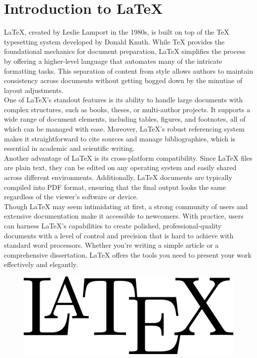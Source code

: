 \documentclass[12pt, a4paper]{article}
\begin{document}
\section*{Introduction to LaTeX}
\vspace{2cm}
LaTeX, created by Leslie Lamport in the 1980s, is built on top of the TeX typesetting system developed by Donald Knuth. While TeX provides the foundational mechanics for document preparation, LaTeX simplifies the process by offering a higher-level language that automates many of the intricate formatting tasks. This separation of content from style allows authors to maintain consistency across documents without getting bogged down by the minutiae of layout adjustments. \\
\vspace{0.3cm}
One of LaTeX's standout features is its ability to handle large documents with complex structures, such as books, theses, or multi-author projects. It supports a wide range of document elements, including tables, figures, and footnotes, all of which can be managed with ease. Moreover, LaTeX's robust referencing system makes it straightforward to cite sources and manage bibliographies, which is essential in academic and scientific writing.\\
\vspace{0.3cm}
Another advantage of LaTeX is its cross-platform compatibility. Since LaTeX files are plain text, they can be edited on any operating system and easily shared across different environments. Additionally, LaTeX documents are typically compiled into PDF format, ensuring that the final output looks the same regardless of the viewer's software or device.\\
\vspace{0.3cm}
Though LaTeX may seem intimidating at first, a strong community of users and extensive documentation make it accessible to newcomers. With practice, users can harness LaTeX's capabilities to create polished, professional-quality documents with a level of control and precision that is hard to achieve with standard word processors. Whether you're writing a simple article or a comprehensive dissertation, LaTeX offers the tools you need to present your work effectively and elegantly.

\begin{figure}
    \centering
    \includegraphics[width=0.3\linewidth]{latex.png}
\end{figure}
\end{document}
